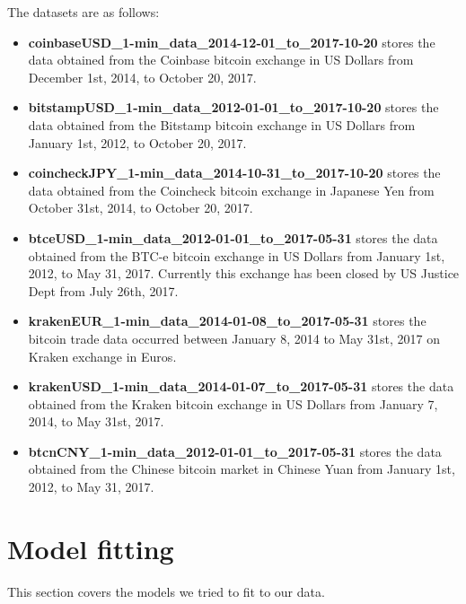 \documentclass{article}
\begin{document}
The datasets are as follows:
\begin{itemize}
\item \textbf{coinbaseUSD\_1-min\_data\_2014-12-01\_to\_2017-10-20} stores the data obtained from the Coinbase bitcoin exchange in US Dollars from December 1st, 2014, to October 20, 2017.

\item \textbf{bitstampUSD\_1-min\_data\_2012-01-01\_to\_2017-10-20} stores the data obtained from the Bitstamp bitcoin exchange in US Dollars from January 1st, 2012, to October 20, 2017.

\item \textbf{coincheckJPY\_1-min\_data\_2014-10-31\_to\_2017-10-20} stores the data obtained from the Coincheck bitcoin exchange in Japanese Yen from October 31st, 2014, to October 20, 2017.

\item \textbf{btceUSD\_1-min\_data\_2012-01-01\_to\_2017-05-31} stores the data obtained from the BTC-e bitcoin exchange in US Dollars from January 1st, 2012, to May 31, 2017. Currently this exchange has been closed by US Justice Dept from July 26th, 2017.

\item \textbf{krakenEUR\_1-min\_data\_2014-01-08\_to\_2017-05-31}  stores the bitcoin trade data occurred between January 8, 2014 to May 31st, 2017 on Kraken exchange in Euros.

\item \textbf{krakenUSD\_1-min\_data\_2014-01-07\_to\_2017-05-31} stores the data obtained from the Kraken bitcoin exchange in US Dollars from January 7, 2014, to May 31st, 2017.

\item \textbf{btcnCNY\_1-min\_data\_2012-01-01\_to\_2017-05-31} stores the data obtained from the Chinese bitcoin market in Chinese Yuan from January 1st, 2012, to May 31, 2017.
\end{itemize}


\section{Model fitting} \label{secModels}
This section covers the models we tried to fit to our data.
\end{document}

